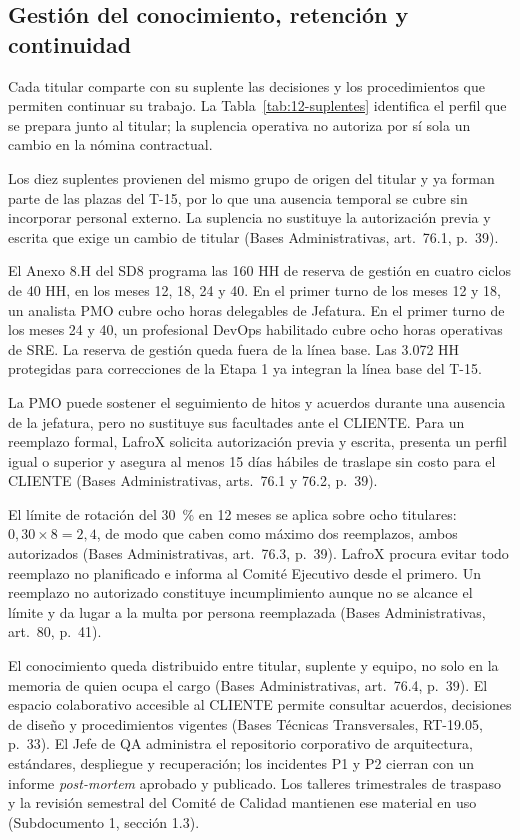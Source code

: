 \subsection{Gestión del conocimiento, retención y continuidad}

Cada titular comparte con su suplente las decisiones y los procedimientos que permiten continuar su trabajo. La Tabla~\ref{tab:12-suplentes} identifica el perfil que se prepara junto al titular; la suplencia operativa no autoriza por sí sola un cambio en la nómina contractual.


Los diez suplentes provienen del mismo grupo de origen del titular y ya forman parte de las plazas del T-15, por lo que una ausencia temporal se cubre sin incorporar personal externo. La suplencia no sustituye la autorización previa y escrita que exige un cambio de titular (Bases Administrativas, art.~76.1, p.~39).

El Anexo 8.H del SD8 programa las 160 HH de reserva de gestión en cuatro ciclos de 40 HH, en los meses 12, 18, 24 y 40. En el primer turno de los meses 12 y 18, un analista PMO cubre ocho horas delegables de Jefatura. En el primer turno de los meses 24 y 40, un profesional DevOps habilitado cubre ocho horas operativas de SRE. La reserva de gestión queda fuera de la línea base. Las 3.072 HH protegidas para correcciones de la Etapa 1 ya integran la línea base del T-15.

La PMO puede sostener el seguimiento de hitos y acuerdos durante una ausencia de la jefatura, pero no sustituye sus facultades ante el CLIENTE. Para un reemplazo formal, LafroX solicita autorización previa y escrita, presenta un perfil igual o superior y asegura al menos 15 días hábiles de traslape sin costo para el CLIENTE (Bases Administrativas, arts.~76.1 y 76.2, p.~39).

El límite de rotación del 30~\% en 12 meses se aplica sobre ocho titulares: \(0{,}30 \times 8 = 2{,}4\), de modo que caben como máximo dos reemplazos, ambos autorizados (Bases Administrativas, art.~76.3, p.~39). LafroX procura evitar todo reemplazo no planificado e informa al Comité Ejecutivo desde el primero. Un reemplazo no autorizado constituye incumplimiento aunque no se alcance el límite y da lugar a la multa por persona reemplazada (Bases Administrativas, art.~80, p.~41).

El conocimiento queda distribuido entre titular, suplente y equipo, no solo en la memoria de quien ocupa el cargo (Bases Administrativas, art.~76.4, p.~39). El espacio colaborativo accesible al CLIENTE permite consultar acuerdos, decisiones de diseño y procedimientos vigentes (Bases Técnicas Transversales, RT-19.05, p.~33). El Jefe de QA administra el repositorio corporativo de arquitectura, estándares, despliegue y recuperación; los incidentes P1 y P2 cierran con un informe \emph{post-mortem} aprobado y publicado. Los talleres trimestrales de traspaso y la revisión semestral del Comité de Calidad mantienen ese material en uso (Subdocumento 1, sección 1.3).

